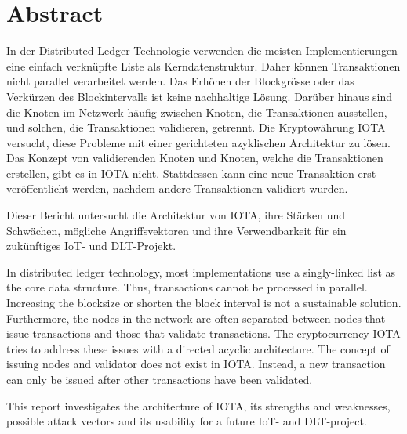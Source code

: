 \chapter*{Abstract}


In der Distributed-Ledger-Technologie verwenden die meisten Implementierungen eine einfach verkn\"upfte Liste als Kerndatenstruktur. Daher k\"onnen Transaktionen nicht parallel verarbeitet werden. Das Erh\"ohen der Blockgr\"osse oder das Verk\"urzen des Blockintervalls ist keine nachhaltige L\"osung. Dar\"uber hinaus sind die Knoten im Netzwerk h\"aufig zwischen Knoten, die Transaktionen ausstellen, und solchen, die Transaktionen validieren, getrennt. Die Kryptow\"ahrung IOTA versucht, diese Probleme mit einer gerichteten azyklischen Architektur zu l\"osen. Das Konzept von validierenden Knoten und Knoten, welche die Transaktionen erstellen, gibt es in IOTA nicht. Stattdessen kann eine neue Transaktion erst ver\"offentlicht werden, nachdem andere Transaktionen validiert wurden.

Dieser Bericht untersucht die Architektur von IOTA, ihre St\"arken und Schw\"achen, m\"ogliche Angriffsvektoren und ihre Verwendbarkeit f\"ur ein zuk\"unftiges IoT- und DLT-Projekt.



In distributed ledger technology, most implementations use a singly-linked list as the core data structure. Thus, transactions cannot be processed in parallel. Increasing the blocksize or shorten the block interval is not a sustainable solution. Furthermore, the nodes in the network are often separated between nodes that issue transactions and those that validate transactions. The cryptocurrency IOTA tries to address these issues with a directed acyclic architecture. The concept of issuing nodes and validator does not exist in IOTA. Instead, a new transaction can only be issued after other transactions have been validated.

This report investigates the architecture of IOTA, its strengths and weaknesses, possible attack vectors and its usability for a future IoT- and DLT-project.
